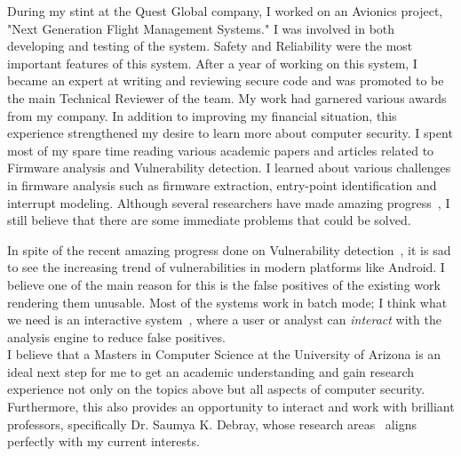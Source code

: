 \documentclass{article}
\begin{document}
During my stint at the Quest Global company, I worked on an Avionics project, "Next Generation Flight Management Systems." I was involved in both developing and testing of the system. Safety and Reliability were the most important features of this system. After a year of working
 on this system, I became an expert at writing and reviewing secure code and was promoted to be the main Technical Reviewer of the team. My work had garnered various awards from my company. In addition to improving my financial situation, this experience strengthened my desire to learn more about computer security. I spent most of my spare time reading various academic papers and articles related to Firmware analysis and Vulnerability detection. I learned about various challenges in firmware analysis such as firmware extraction, entry-point identification and interrupt modeling. Although several researchers have made amazing progress~\cite{zaddach2014avatar, shoshitaishvili2015firmalice, costin2014large}, I still believe that there are some immediate problems that could be solved.

In spite of the recent amazing progress done on Vulnerability detection~\cite{machiry2017dr, redini2017bootstomp}, it is sad to see the increasing trend of vulnerabilities in modern platforms like Android. I believe one of the main reason for this is the false positives of the existing work rendering them unusable. Most of the systems work in batch mode; I think what we need is an interactive system~\cite{Mangal:2015:UAP:2786805.2786851}, where a user or analyst can \emph{interact} with the analysis engine to reduce false positives.\\

I believe that a Masters in Computer Science at the University of Arizona is an ideal next step for me to get an academic understanding and gain research experience not only on the topics above but all aspects of computer security. Furthermore, this also provides an opportunity to interact and work with brilliant professors, specifically Dr. Saumya K. Debray, whose research areas~\cite{ yadegari2015generic, yadegari2015symbolic} aligns perfectly with my current interests.

\medskip

{}

\end{document}
